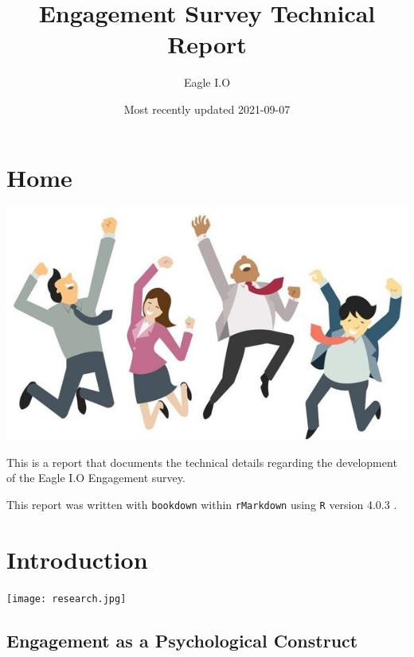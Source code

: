 \documentclass[
]{book}
\title{Engagement Survey Technical Report}
\author{Eagle I.O}
\date{Most recently updated 2021-09-07}
\begin{document}
\maketitle

{
\setcounter{tocdepth}{4}
\tableofcontents
}
\hypertarget{home}{%
\chapter*{Home}\label{home}}

\includegraphics{EE.jpeg}

This is a report that documents the technical details regarding the development of the Eagle I.O Engagement survey.

This report was written with \texttt{bookdown} \citep{R-bookdown} within \texttt{rMarkdown} \citep{R-markdown} using \texttt{R} version 4.0.3 \citep{R-base}.

\hypertarget{intro}{%
\chapter{Introduction}\label{intro}}

\texttt{[image: research.jpg]}

\hypertarget{engagement-as-a-psychological-construct}{%
\section{Engagement as a Psychological Construct}\label{engagement-as-a-psychological-construct}}
\end{document}
